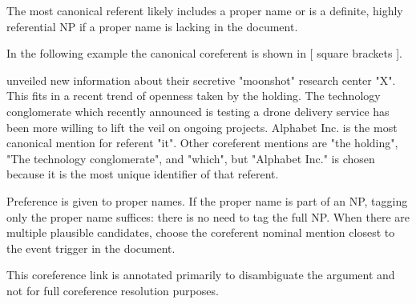 The most canonical referent likely includes a proper name or is a definite, highly referential NP if a proper name is lacking in the document.

In the following example the canonical coreferent is shown in [ square brackets ].
\begin{exe}
     unveiled new information about their secretive "moonshot" research center "X". This fits in a recent trend of openness taken by the holding. The technology conglomerate which recently announced  is testing a drone delivery service has been more willing to lift the veil on ongoing projects.
        \expl Alphabet Inc. is the most canonical mention for referent "it". Other coreferent mentions are "the holding", "The technology conglomerate", and "which", but "Alphabet Inc." is chosen because it is the most unique identifier of that referent.
\end{exe}

Preference is given to proper names.
If the proper name is part of an NP, tagging only the proper name suffices: there is no need to tag the full NP.
When there are multiple plausible candidates, choose the coreferent nominal mention closest to the event trigger in the document.

This coreference link is annotated primarily to disambiguate the argument and not for full coreference resolution purposes.


 
